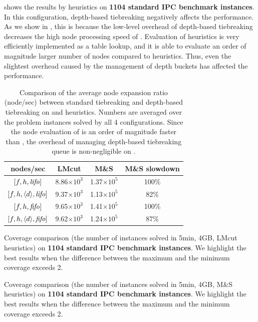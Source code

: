  shows the results by \mands heuristics on \textbf{1104 standard
IPC benchmark instances}.
In this configuration, depth-based tiebreaking negatively affects the performance.
As we show in , this is because
the low-level overhead of depth-based tiebreaking decreases the high
node processing speed of \mands. Evaluation of \mands heuristics is
very efficiently implemented as a table lookup, and it is able to
evaluate an order of magnitude larger number of nodes
compared to \lmcut heuristics. Thus, even the slightest overhead caused
by the management of depth buckets has affected the performance.

\begin{table}[htb]
 \centering
 \begin{tabular}{cccc}
  nodes/sec                  & LMcut      & M\&S       & M\&S slowdown\\
  \hline
  $[f,h,{\text{\textit{lifo}}}]$              & 8.86$\times 10^3$ & 1.37$\times 10^5$ & 100\%\\
  $[f,h,{\left<d\right>},{\text{\textit{lifo}}}]$ & 9.37$\times 10^3$ & 1.13$\times 10^5$ & 82\%\\
  \hline
  $[f,h,{\text{\textit{fifo}}}]$              & 9.65$\times 10^3$ & 1.41$\times 10^5$ & 100\%\\
  $[f,h,{\left<d\right>},{\text{\textit{fifo}}}]$ & 9.62$\times 10^3$ & 1.24$\times 10^5$ & 87\%\\
  \hline
 \end{tabular}
 \caption{Comparison of the average node expansion ratio (node/sec) between
 standard tiebreaking and depth-based tiebreaking on \lmcut and \mands
 heuristics. Numbers are averaged over the problem instances solved by
 all 4 configurations. Since the node evaluation of \mands is an order of
 magnitude faster than \lmcut, the overhead of managing depth-based
 tiebreaking queue is non-negligible on \mands.}
 \label{tbl:expansion-ratio}
\end{table}

\begin{table}[htbp]
 {
 \centering
 
  \caption{
 Coverage comparison (the number of instances solved in 5min, 4GB, LMcut
 heuristics) on \textbf{1104 standard IPC benchmark instances}. We highlight the
 best results when the difference between the maximum and the minimum coverage exceeds 2.
 }
 \label{tbl:lmcut-ipc-full}
 }
\end{table}

\begin{table}[htbp]
 {
 \centering
 
  \caption{
 Coverage comparison (the number of instances solved in 5min, 4GB, M\&S
 heuristics) on \textbf{1104 standard IPC benchmark instances}. We highlight the
 best results when the difference between the maximum and the minimum coverage exceeds 2.
 }
 \label{tbl:mands-ipc-full}
 }
\end{table}

